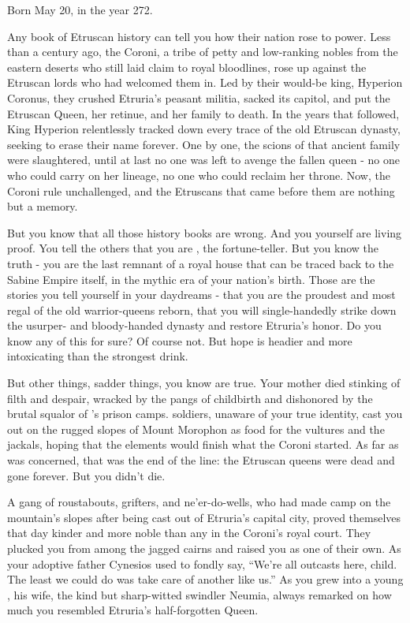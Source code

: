 \documentclass[char]{Kos}
\begin{document}
\name{\cBurglar{}}

Born May 20, in the year 272.

    Any book of Etruscan history can tell you how their nation rose to power. Less than a century ago, the Coroni, a tribe of petty and low-ranking nobles from the eastern deserts who still laid claim to royal bloodlines, rose up against the Etruscan lords who had welcomed them in. Led by their would-be king, Hyperion Coronus, they crushed Etruria's peasant militia, sacked its capitol, and put the Etruscan Queen, her retinue, and her family to death. In the years that followed, King Hyperion relentlessly tracked down every trace of the old Etruscan dynasty, seeking to erase their name forever. One by one, the scions of that ancient family were slaughtered, until at last no one was left to avenge the fallen queen - no one who could carry on her lineage, no one who could reclaim her throne. Now, the Coroni rule unchallenged, and the Etruscans that came before them are nothing but a memory. 

    But you know that all those history books are wrong. And you yourself are living proof. You tell the others that you are \cBurglar{}, the fortune-teller. But you know the truth - you are the last remnant of a royal house that can be traced back to the Sabine Empire itself, in the mythic era of your nation's birth. Those are the stories you tell yourself in your daydreams - that you are the proudest and most regal of the old warrior-queens reborn, that you will single-handedly strike down \cEtruriaKing{} the usurper-\cEtruriaKing{\monarch} and \cEtruriaKing{\their} bloody-handed dynasty and restore Etruria's honor. Do you know any of this for sure? Of course not. But hope is headier and more intoxicating than the strongest drink.

    But other things, sadder things, you know are true. Your mother died stinking of filth and despair, wracked by the pangs of childbirth and dishonored by the brutal squalor of \cEtruriaKing{\Monarch} \cEtruriaKing{}'s prison camps. \cEtruriaKing{\Their} soldiers, unaware of your true identity, cast you out on the rugged slopes of Mount Morophon as food for the vultures and the jackals, hoping that the elements would finish what the Coroni started. As far as \cEtruriaKing{\Monarch} \cEtruriaKing{} was concerned, that was the end of the line: the Etruscan queens were dead and gone forever. But you didn't die. 

    A gang of roustabouts, grifters, and ne'er-do-wells, who had made camp on the mountain's slopes after being cast out of Etruria's capital city, proved themselves that day kinder and more noble than any in the Coroni's royal court. They plucked you from among the jagged cairns and raised you as one of their own. As your adoptive father Cynesios used to fondly say, ``We're all outcasts here, child. The least we could do was take care of another like us.'' As you grew into a young \cBurglar{\human}, his wife, the kind but sharp-witted swindler Neumia, always remarked on how much you resembled Etruria's half-forgotten Queen. 
\end{document}
